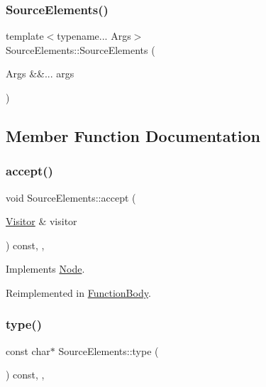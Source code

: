 \subsubsection{\texorpdfstring{Source\+Elements()}{SourceElements()}}
{\footnotesize\ttfamily template$<$typename... Args$>$ \\
Source\+Elements\+::\+Source\+Elements (\begin{DoxyParamCaption}\item[{Args \&\&...}]{args }\end{DoxyParamCaption})\hspace{0.3cm}{\ttfamily [inline]}}



\subsection{Member Function Documentation}
\mbox{\label{struct_source_elements_af5c2f1b3c9a9961f4d76734953a4fdf5}} 
\subsubsection{\texorpdfstring{accept()}{accept()}}
{\footnotesize\ttfamily void Source\+Elements\+::accept (\begin{DoxyParamCaption}\item[{\hyperlink{struct_visitor}{Visitor} \&}]{visitor }\end{DoxyParamCaption}) const\hspace{0.3cm}{\ttfamily [inline]}, {\ttfamily [override]}, {\ttfamily [virtual]}}



Implements \hyperlink{struct_node_a10bd7af968140bbf5fa461298a969c71}{Node}.



Reimplemented in \hyperlink{struct_function_body_ab6acc0d3e8a2bf452045ee4adc78aa26}{Function\+Body}.

\mbox{\label{struct_source_elements_a2e6131a995ee5d7e0c8e7a440827245d}} 
\subsubsection{\texorpdfstring{type()}{type()}}
{\footnotesize\ttfamily const char$\ast$ Source\+Elements\+::type (\begin{DoxyParamCaption}{ }\end{DoxyParamCaption}) const\hspace{0.3cm}{\ttfamily [inline]}, {\ttfamily [override]}, {\ttfamily [virtual]}}



